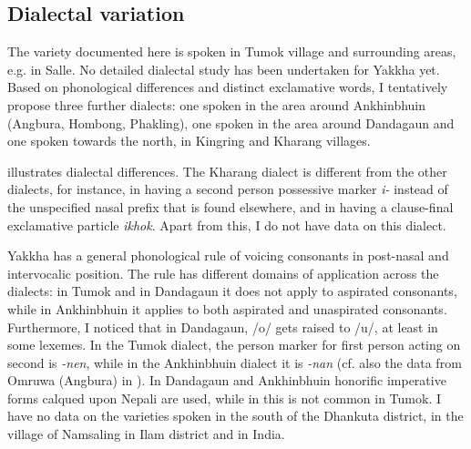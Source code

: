 \subsection{Dialectal variation}\label{sc-dialect}

The variety documented here is spoken in Tumok village and surrounding areas, e.g. in Salle. No detailed dialectal study has been undertaken for Yakkha yet. Based on phonological differences and distinct exclamative words, I tentatively propose three further dialects: one spoken in the area around Ankhinbhuin (Angbura, Hombong, Phakling), one spoken in the area around Dandagaun and one spoken towards the north, in Kingring and Kharang villages. 

 illustrates dialectal differences. The Kharang dialect is different from the other dialects, for instance, in having a second person possessive marker \emph{i-} instead of the unspecified nasal prefix that is found elsewhere,  and in having a clause-final exclamative particle \emph{ikhok}. Apart from this, I do not have data on this dialect. 

Yakkha has a general phonological rule of voicing consonants in post-nasal and intervocalic position. The rule has different domains of application across the dialects: in Tumok and in Dandagaun it does not apply to aspirated consonants, while in Ankhinbhuin it applies to both aspirated and unaspirated consonants. Furthermore, I noticed that in Dandagaun,  /o/ gets raised to /u/, at least in some lexemes. In the Tumok  dialect, the person marker for first person acting on second is \emph{-nen}, while in the Ankhinbhuin dialect it is \emph{-nan} (cf. also the data from Omruwa (Angbura) in \citealt{Driem1994The-Yakkha}). In Dandagaun and Ankhinbhuin honorific imperative forms calqued upon Nepali are used, while in  this is not common in Tumok. I have no data on the varieties spoken in the south of the Dhankuta district, in the village of Namsaling in Ilam district and in India.


